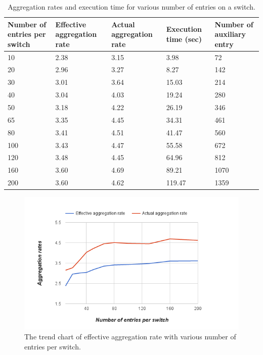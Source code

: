 \begin{table}
\centering
\caption{Aggregation rates and execution time for various number of entries on a switch.}
\begin{tabular}{|p{1.8cm}|p{2.6cm}|p{2.6cm}|p{1.9cm}|p{2.8cm}|}
\hline Number of entries per switch & Effective aggregation rate & Actual aggregation rate & Execution time (sec) & Number of auxiliary entry \\
\hline
\hline 10 & 2.38 & 3.15 & 3.98 & 72 \\
\hline 20 & 2.96 & 3.27 & 8.27 & 142 \\
\hline 30 & 3.01 & 3.64 & 15.03 & 214 \\
\hline 40 & 3.04 & 4.03 & 19.24 & 280 \\
\hline 50 & 3.18 & 4.22 & 26.19 & 346 \\
\hline 65 & 3.35 & 4.45 & 34.31 & 461 \\
\hline 80 & 3.41 & 4.51 & 41.47 & 560 \\
\hline 100 & 3.43 & 4.47 & 55.58 & 672 \\
\hline 120 & 3.48 & 4.45 & 64.96 & 812 \\
\hline 160 & 3.60 & 4.69 & 89.21 & 1070 \\
\hline 200 & 3.60 & 4.62 & 119.47 & 1359 \\
\hline 
\end{tabular}
\label{table:different_entry_per_switch}
\end{table}

\begin{figure}[H]
\begin{center} 
\includegraphics[width=1\textwidth]{figures/exp_entrynum_trend.png}
\end{center}
\caption{The trend chart of effective aggregation rate with various number of entries per switch.}
\label{exp_entrynum_trend}
\end{figure}

